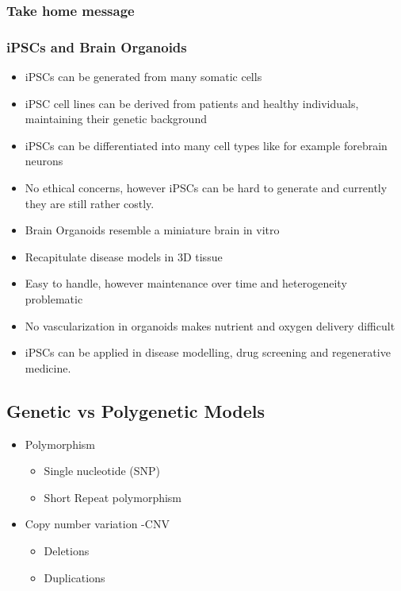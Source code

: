 \begin{itemize}
\begin{itemize}
\subsubsection{Take home message}
\subsubsection{iPSCs and Brain Organoids}

\begin{itemize}
    \item iPSCs can be generated from many somatic cells
    \item iPSC cell lines can be derived from patients and healthy individuals, maintaining their genetic background
    \item iPSCs can be differentiated into many cell types like for example forebrain neurons
    \item No ethical concerns, however iPSCs can be hard to generate and currently they are still rather costly.
    \item Brain Organoids resemble a miniature brain in vitro
    \item Recapitulate disease models in 3D tissue
    \item Easy to handle, however maintenance over time and heterogeneity problematic
    \item No vascularization in organoids makes nutrient and oxygen delivery difficult
    \item iPSCs can be applied in disease modelling, drug screening and regenerative medicine.
\end{itemize}
\subsection{Genetic vs Polygenetic Models}
\begin{itemize}
    \item Polymorphism
    \begin{itemize}
        \item Single nucleotide (SNP)
        \item Short Repeat polymorphism
    \end{itemize}
\end{itemize}
\begin{itemize}
    \item Copy number variation -CNV
    \begin{itemize}
        \item Deletions
        \item Duplications
    \end{itemize}
\end{itemize}

\end{itemize}
\end{itemize}
